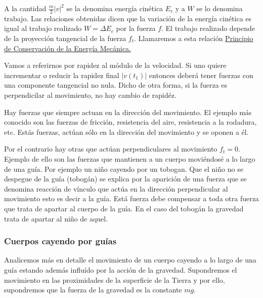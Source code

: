 \documentclass{article}
\renewcommand{\emph}[1]{\textcolor[rgb]{1,0,0}{#1}}
\begin{document}
  A la cantidad $\frac{m}{2}|v|^2$ se la denomina \emph{energía cinética} $E_c$ y a $W$ se lo denomina \emph{trabajo}.
Las relaciones obtenidas dicen que la variación de la energía cinética es igual al trabajo realizado $W=\Delta E_c$ por la fuerza $f$.
El trabajo realizado depende de la proyección tangencial de la fuerza $f_t$.  Llamaremos a esta relación
\href{https://es.wikipedia.org/wiki/Conservaci%C3%B3n_de_la_energ%C3%ADa}{Principio de Conservación de la Energía Mecánica.}

  Vamos a referirnos por \emph{rapidez} al módulo de la velocidad.
Si uno quiere incrementar o reducir la rapidez final $|v(t_1)|$ entonces deberá tener fuerzas con una componente tangencial no nula. 
Dicho de otra forma, si la fuerza es perpendicilar al movimiento, no hay cambio de rapidéz. 

  Hay fuerzas que siempre actuan en la dirección del movimiento. El ejemplo más conocido son las fuerzas de fricción, resistencia del aire,
resistencia a la rodadura, etc. Estás fuerzas, actúan sólo en la dirección del movimiento y se oponen a él.


 

  Por el contrario hay otras que actúan perpendiculares al movimiento $f_t=0$. Ejemplo de ello son las fuerzas que mantienen a un cuerpo moviéndosé a lo largo
de una guía. Por ejemplo un niño cayendo por un tobogan. Que el niño no se despegue de la guía (tobogán) se explica por la aparición de una fuerza que se denomina
reacción de vínculo que actúa en la dirección perpendicular al movimiento esto es decir a la guía. Está fuerza debe compensar a toda otra fuerza que trata de apartar
al cuerpo de la guía.  En el caso del tobogán la gravedad trata de apartar al niño de aquel.





\subsubsection{Cuerpos cayendo por guías}
Analicemos más en detalle el movimiento de un cuerpo cayendo a lo largo de una guía estando además influído  por la acción de la gravedad. Supondremos el movimiento en las proximidades de la superficie de la Tierra y por ello, supondremos que la fuerza de la gravedad es la constante $mg$. 
\end{document}

